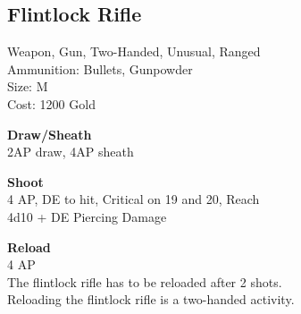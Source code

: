 \subsection{Flintlock Rifle}\label{weapon:flintlockRifle}
Weapon, Gun, Two-Handed, Unusual, Ranged\\
Ammunition: Bullets, Gunpowder\\
Size: M\\
Cost: 1200 Gold

\textbf{Draw/Sheath} \\
2AP draw, 4AP sheath

\textbf{Shoot} \\
4 AP, DE to hit, Critical on 19 and 20,  Reach\\
4d10 + DE Piercing Damage

\textbf{Reload} \\
4 AP\\
The flintlock rifle has to be reloaded after 2 shots.\\
Reloading the flintlock rifle is a two-handed activity.

